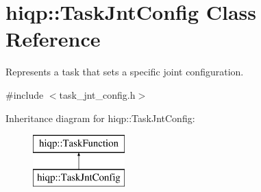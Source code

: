 \hypertarget{classhiqp_1_1TaskJntConfig}{\section{hiqp\-:\-:Task\-Jnt\-Config Class Reference}
\label{classhiqp_1_1TaskJntConfig}
}


Represents a task that sets a specific joint configuration.  




{\ttfamily \#include $<$task\-\_\-jnt\-\_\-config.\-h$>$}

Inheritance diagram for hiqp\-:\-:Task\-Jnt\-Config\-:\begin{figure}[H]
\begin{center}
\leavevmode
\includegraphics[height=2.000000cm]{classhiqp_1_1TaskJntConfig}
\end{center}
\end{figure}
